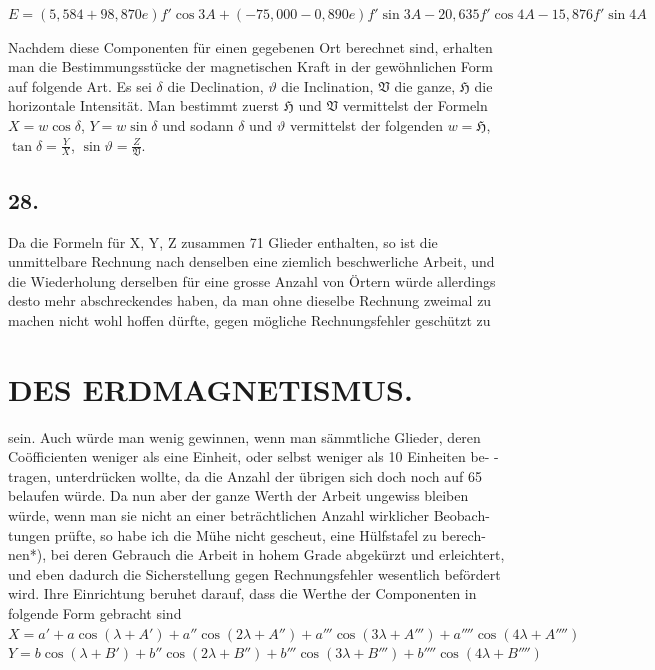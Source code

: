 \documentclass[12pt,a4paper]{article}
\begin{document}
$E = (5,584 + 98,870e)f'\cos 3A + (-75,000 - 0,890e)f'\sin 3A - 20,635 f'\cos 4A - 15,876 f'\sin 4A$


Nachdem diese Componenten für einen gegebenen Ort berechnet sind, erhalten man die Bestimmungsstücke der magnetischen Kraft in der gewöhnlichen Form auf folgende Art. Es sei $\delta$ die Declination, $\vartheta$ die Inclination, $\mathfrak{V}$ die ganze, $\mathfrak{H}$ die horizontale Intensität. Man bestimmt zuerst $\mathfrak{H}$ und $\mathfrak{V}$ vermittelst der Formeln $X=w\cos\delta$, $Y=w\sin\delta$ und sodann $\delta$ und $\vartheta$ vermittelst der folgenden $w = \mathfrak{H}$, $\tan\delta = \frac{Y}{X}$, $\sin\vartheta = \frac{Z}{\mathfrak{V}}$.

\subsection*{28.}
Da die Formeln für X, Y, Z zusammen 71 Glieder enthalten, so ist die unmittelbare Rechnung nach denselben eine ziemlich beschwerliche Arbeit, und die Wiederholung derselben für eine grosse Anzahl von Örtern würde allerdings desto mehr abschreckendes haben, da man ohne dieselbe Rechnung zweimal zu machen nicht wohl hoffen dürfte, gegen mögliche Rechnungsfehler geschützt zu


\newpage


\section*{DES ERDMAGNETISMUS.}
sein. Auch würde man wenig gewinnen, wenn man sämmtliche Glieder, deren Coöfficienten weniger als eine Einheit, oder selbst weniger als 10 Einheiten be- -tragen, unterdrücken wollte, da die Anzahl der übrigen sich doch noch auf 65 belaufen würde. Da nun aber der ganze Werth der Arbeit ungewiss bleiben würde, wenn man sie nicht an einer beträchtlichen Anzahl wirklicher Beobach- tungen prüfte, so habe ich die Mühe nicht gescheut, eine Hülfstafel zu berech- nen*), bei deren Gebrauch die Arbeit in hohem Grade abgekürzt und erleichtert, und eben dadurch die Sicherstellung gegen Rechnungsfehler wesentlich befördert wird. Ihre Einrichtung beruhet darauf, dass die Werthe der Componenten in folgende Form gebracht sind
$X = a' + a\cos(\lambda + A') + a''\cos(2\lambda + A'') + a'''\cos(3\lambda + A''') + a''''\cos(4\lambda + A'''')$
$Y = b\cos(\lambda + B') + b''\cos(2\lambda + B'') + b'''\cos(3\lambda + B''') + b''''\cos(4\lambda + B'''')$
\end{document}

